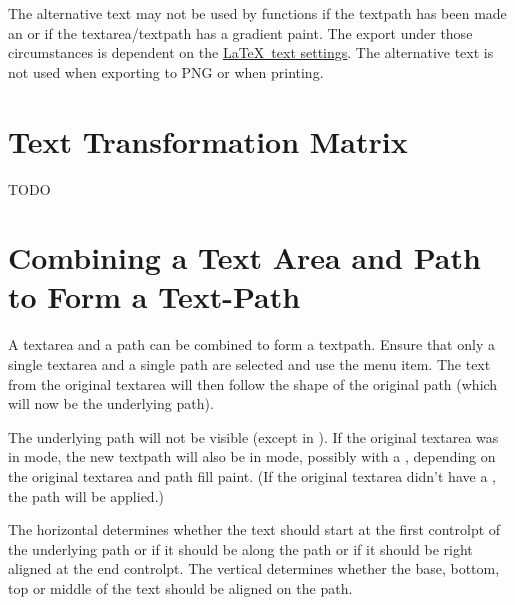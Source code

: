 \begin{important}
The alternative text may not be used by  functions if
the \gls*{textpath} has been made an  or if the
\gls*{textarea}\slash\gls*{textpath} has a gradient paint.
The export  under those circumstances is dependent on
the \hyperref[sec:texconfigtext]{\LaTeX\ text settings}.
The alternative text is not used when exporting to PNG or when
\gls{printing}.
\end{important}


\section{Text Transformation Matrix}\label{sec:textmatrix}


TODO


\section{Combining a Text Area and Path to Form a Text-Path}\label{sec:textpath}


A \gls{textarea} and a \gls{path} can be combined to form a
\gls{textpath}. Ensure that only a single \gls{textarea} and a
single \gls{path} are selected and use the 
menu item. The text from the original \gls{textarea} will then follow
the shape of the original path (which will now be the underlying
path).

The underlying path will not be visible (except in \editpathmode).
If the original \gls*{textarea} was in  mode, the new
\gls*{textpath} will also be in  mode, possibly with a 
, depending on the original \gls*{textarea} and \gls*{path}
fill paint. (If the original \gls*{textarea} didn't have a
, the \gls*{path}  will be applied.)

The horizontal  determines
whether the text should start at the first \gls{controlpt} of the
underlying path or if it should be  along the path or if
it should be right aligned at the end \gls*{controlpt}. The vertical
 determines whether the base, bottom, top or middle of the
text should be aligned on the path. 

